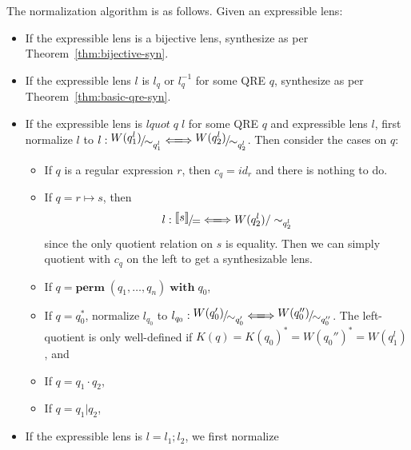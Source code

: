\documentclass[a4paper,11pt] {article}
\theoremstyle{plain}
\newcommand{\lquot}{\textit{lquot}}
\newcommand{\lensbetween}[1]{\xLongleftrightarrow{#1}}
\newcommand{\perm}{ \textbf{perm}\; }
\newcommand{\with}{ \;\textbf{with}\; }
\newcommand{\niceFrac}[2]{%
    \raise.5ex\hbox{$#1$}%
    \kern-.1em/\kern-.15em%
    \lower.25ex\hbox{$#2$}}
\begin{document}
The normalization algorithm is as follows. Given an expressible lens:
\begin{itemize}
\item If the expressible lens is a bijective lens, synthesize as per
  Theorem~\ref{thm:bijective-syn}.
\item If the expressible lens $l$ is $l_q$ or $l_q^{-1}$ for some QRE
  $q$, synthesize as per Theorem~\ref{thm:basic-qre-syn}.
\item If the expressible lens is $\lquot \; q \; l$ for some QRE $q$
  and expressible lens $l$, first normalize $l$
  to $l: \niceFrac{W(q_1^l)}{\sim_{q_1^l}} \lensbetween{}
  \niceFrac{W(q_2^l)}{\sim_{q_2^l}}$. Then consider the
  cases on $q$:
  \begin{itemize}
  \item If $q$ is a regular expression $r$, then
    $c_q = \mathit{id}_{r}$ and there is nothing to do.
  \item If $q = r \mapsto s$, then
    \begin{align*}
      l: \niceFrac{\llbracket s \rrbracket}{=} \lensbetween{}
      W(q_2^l)/\sim_{q_2^l}
    \end{align*}
    since the only quotient relation on $s$ is equality.
    Then we can simply quotient with $c_q$ on the left to get
    a synthesizable lens.
    
  \item If $q = \perm(q_1, \ldots, q_n) \with q_0$,
    
    
  \item If $q = q_0^*$,
    normalize $l_{q_0}$ to
    $l_{q_0}: \niceFrac{W(q_0')}{\sim_{q_0'}} \lensbetween{}
    \niceFrac{W(q_0'')}{\sim_{q_0''}}$. 
    The left-quotient is only well-defined if
    $K(q) = K(q_0)^* = W(q_0'')^* = W(q_1^l)$, and
    
  \item If $q = q_1 \cdot q_2$,
  \item If $q = q_1 | q_2$, 
  \end{itemize}
\item If the expressible lens is $l = l_1; l_2$,
  we first normalize 
\end{itemize}
\end{document}
